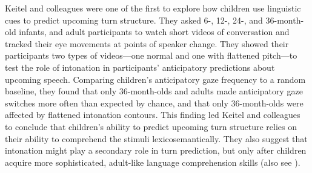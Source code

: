 \documentclass[authoryear, 12pt]{elsarticle}
\begin{document}



Keitel and colleagues \citeyearpar{keitel2013} were one of the first to explore how children use linguistic cues to predict upcoming turn structure. They asked 6-, 12-, 24-, and 36-month-old infants, and adult participants to watch short videos of conversation and tracked their eye movements at points of speaker change. They showed their participants two types of videos---one normal and one with flattened pitch---to test the role of intonation in participants' anticipatory predictions about upcoming speech. Comparing children's anticipatory gaze frequency to a random baseline, they found that only 36-month-olds and adults made anticipatory gaze switches more often than expected by chance, and that only 36-month-olds were affected by flattened intonation contours. This finding led Keitel and colleagues to conclude that children's ability to predict upcoming turn structure relies on their ability to comprehend the stimuli lexicosemantically. They also suggest that intonation might play a secondary role in turn prediction, but only after children acquire more sophisticated, adult-like language comprehension skills (also see \citealp{keitel2015}).
\end{document}
